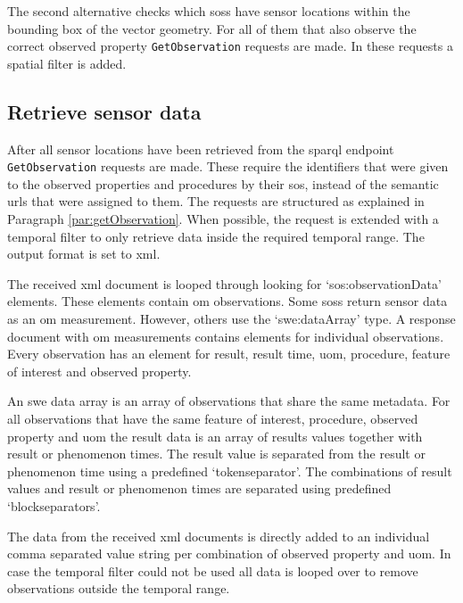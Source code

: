 The second alternative checks which \aclp{sos} have sensor locations within the bounding box of the vector geometry. For all of them that also observe the correct observed property \texttt{GetObservation} requests are made. In these requests a spatial filter is added. 


\subsection{Retrieve sensor data}
After all sensor locations have been retrieved from the \ac{sparql} endpoint \texttt{GetObservation} requests are made. These require the identifiers that were given to the observed properties and procedures by their \ac{sos}, instead of the semantic \acp{url} that were assigned to them. The requests are structured as explained in Paragraph \ref{par:getObservation}. When possible, the request is extended with a temporal filter to only retrieve data inside the required temporal range. The output format is set to \ac{xml}.

\begin{sloppypar}
The received \ac{xml} document is looped through looking for `sos:observationData' elements. These elements contain \ac{om} observations. Some \aclp{sos} return sensor data as an \ac{om} measurement. However, others use the `\ac{swe}:dataArray' type. A response document with \ac{om} measurements contains elements for individual observations. Every observation has an element for result, result time, \ac{uom}, procedure, feature of interest and observed property.  
\end{sloppypar}

An \ac{swe} data array is an array of observations that share the same metadata. For all observations that have the same feature of interest, procedure, observed property and \ac{uom} the result data is an array of  results values together with result or phenomenon times. The result value is separated from the result or phenomenon time using a predefined `tokenseparator'. The combinations of result values and result or phenomenon times are separated using predefined `blockseparators'.  

The data from the received \ac{xml} documents is directly added to an individual comma separated value string per combination of observed property and \ac{uom}. In case the temporal filter could not be used all data is looped over to remove observations outside the temporal range. 

